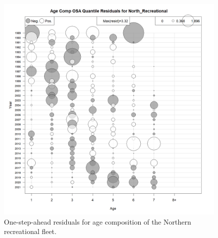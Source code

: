 \documentclass[
]{article}
\begin{document}
\begin{figure}

{\centering \includegraphics[width=1\linewidth]{../2023.RT.Runs/Run34/plots_png/diagnostics/Catch_age_comp_osa_resids_North_Recreational} 

}

\caption{One-step-ahead residuals for age composition of the Northern recreational fleet.}\label{fig:osa-North-rec-paa}
\end{figure}
\end{document}
